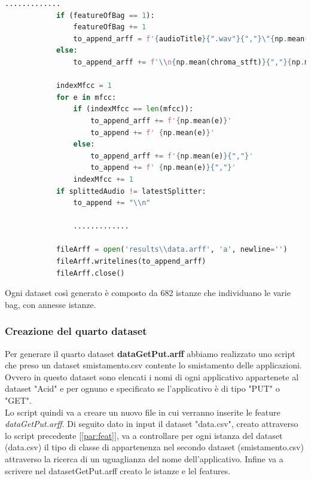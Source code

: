 \begin{lstlisting}[language=Python, caption=Arff formatting string, label = lst:splitFun]
                .............
            if (featureOfBag == 1):
                featureOfBag += 1
                to_append_arff = f'{audioTitle}{".wav"}{","}\"{np.mean(chroma_stft)}{","}{np.mean(spec_cent)}{","}{np.mean(spec_bw)}{","}{np.mean(rolloff)}{","}{np.mean(zcr)}{","}'
            else:
                to_append_arff += f'\\n{np.mean(chroma_stft)}{","}{np.mean(spec_cent)}{","}{np.mean(spec_bw)}{","}{np.mean(rolloff)}{","}{np.mean(zcr)}{","}'

            indexMfcc = 1
            for e in mfcc:
                if (indexMfcc == len(mfcc)): 
                    to_append_arff += f'{np.mean(e)}' 
                    to_append += f' {np.mean(e)}'
                else:
                    to_append_arff += f'{np.mean(e)}{","}' 
                    to_append += f' {np.mean(e)}{","}'
                indexMfcc += 1
            if splittedAudio != latestSplitter:
                to_append += "\\n"
                
                .............
                
            fileArff = open('results\\data.arff', 'a', newline='')
            fileArff.writelines(to_append_arff)
            fileArff.close()
\end{lstlisting}

Ogni dataset così generato è composto da 682 istanze che individuano le varie bag, con annesse istanze. 

\subsubsection{Creazione del quarto dataset}
Per generare il quarto dataset \textbf{dataGetPut.arff} abbiamo realizzato uno script che preso un dataset smistamento.csv contente lo smistamento delle applicazioni. Ovvero in questo dataset sono elencati i nomi di ogni applicativo appartenete al dataset "Acid" e per ognuno e specificato se l'applicativo è di tipo "PUT" o "GET".  
\\Lo script quindi va a creare un nuovo file in cui verranno inserite le feature \textit{dataGetPut.arff}. Di seguito dato in input il dataset "data.csv", creato attraverso lo script precedente [\ref{par:feat}], va a controllare per ogni istanza del dataset (data.csv) il tipo di classe di appartenenza nel secondo dataset (smistamento.csv) attraverso la ricerca di un uguaglianza del nome dell'applicativo. Infine va a scrivere nel datasetGetPut.arff creato le istanze e lel features. 

